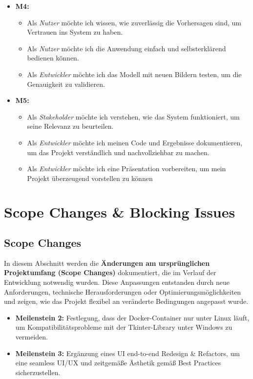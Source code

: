 \documentclass[12pt, a4paper]{scrreprt}
\begin{document}
\begin{itemize}
    \item \textbf{M4:}
    \begin{itemize}
        \item Als \emph{Nutzer} möchte ich wissen, wie zuverlässig die Vorhersagen sind, um Vertrauen ins System zu haben.
        \item Als \emph{Nutzer} möchte ich die Anwendung einfach und selbsterklärend bedienen können.
        \item Als \emph{Entwickler} möchte ich das Modell mit neuen Bildern testen, um die Genauigkeit zu validieren.
    \end{itemize}
    \item \textbf{M5:}
    \begin{itemize}
        \item Als \emph{Stakeholder} möchte ich verstehen, wie das System funktioniert, um seine Relevanz zu beurteilen.
        \item Als \emph{Entwickler} möchte ich meinen Code und Ergebnisse dokumentieren, um das Projekt verständlich und nachvollziehbar zu machen.
        \item Als \emph{Entwickler} möchte ich eine Präsentation vorbereiten, um mein Projekt überzeugend vorstellen zu können
    \end{itemize}
\end{itemize}

\chapter{Scope Changes \& Blocking Issues}

\section{Scope Changes}
In diesem Abschnitt werden die \textbf{Änderungen am ursprünglichen Projektumfang (Scope Changes)} dokumentiert, die im Verlauf der Entwicklung notwendig wurden. Diese Anpassungen entstanden durch neue Anforderungen, technische Herausforderungen oder Optimierungsmöglichkeiten und zeigen, wie das Projekt flexibel an veränderte Bedingungen angepasst wurde.
\begin{itemize}
    \item \textbf{Meilenstein 2:} Festlegung, dass der Docker-Container nur unter Linux läuft, um Kompatibilitätsprobleme mit der Tkinter-Library unter Windows zu vermeiden.
    \item \textbf{Meilenstein 3:} Ergänzung eines UI end-to-end Redesign \& Refactors, um eine seamless UI/UX und zeitgemäße Ästhetik gemäß Best Practices sicherzustellen.
\end{itemize}
\end{document}
